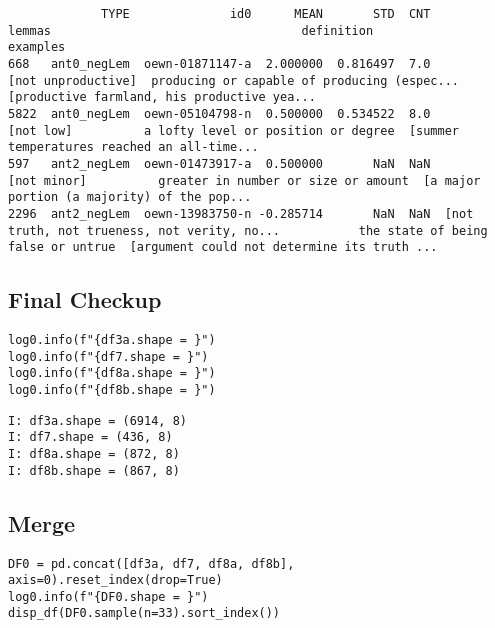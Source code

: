 \documentclass[a4paper,10pt,onecolumn,oneside,openright]{article}
\begin{document}
\begin{verbatim}
             TYPE              id0      MEAN       STD  CNT                                       lemmas                                   definition                                     examples
668   ant0_negLem  oewn-01871147-a  2.000000  0.816497  7.0                           [not unproductive]  producing or capable of producing (espec...  [productive farmland, his productive yea...
5822  ant0_negLem  oewn-05104798-n  0.500000  0.534522  8.0                                    [not low]          a lofty level or position or degree  [summer temperatures reached an all-time...
597   ant2_negLem  oewn-01473917-a  0.500000       NaN  NaN                                  [not minor]          greater in number or size or amount  [a major portion (a majority) of the pop...
2296  ant2_negLem  oewn-13983750-n -0.285714       NaN  NaN  [not truth, not trueness, not verity, no...           the state of being false or untrue  [argument could not determine its truth ...
\end{verbatim}

\subsection{Final Checkup}
\label{sec:org4376fbf}
\begin{verbatim}
log0.info(f"{df3a.shape = }")
log0.info(f"{df7.shape = }")
log0.info(f"{df8a.shape = }")
log0.info(f"{df8b.shape = }")
\end{verbatim}

\begin{verbatim}
I: df3a.shape = (6914, 8)
I: df7.shape = (436, 8)
I: df8a.shape = (872, 8)
I: df8b.shape = (867, 8)
\end{verbatim}

\subsection{Merge}
\label{sec:org27a6179}
\begin{verbatim}
DF0 = pd.concat([df3a, df7, df8a, df8b], axis=0).reset_index(drop=True)
log0.info(f"{DF0.shape = }")
disp_df(DF0.sample(n=33).sort_index())
\end{verbatim}
\end{document}
